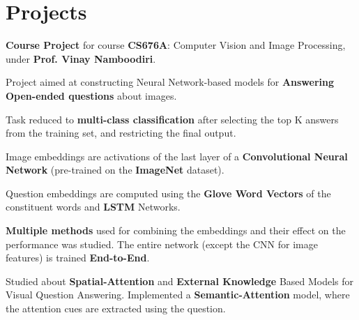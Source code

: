 \documentclass[a4paper]{norm-resume}
\begin{document}
\vspace{0mm}	%


\section{Projects \hrulefill}

\vspace{2mm} %

	\begin{tightitemize}
	\small
	{
	\item \textbf{Course Project} for course \textbf{CS676A}: Computer Vision and Image Processing, under \textbf{Prof. Vinay Namboodiri}.
	\item Project aimed at constructing Neural Network-based models for \textbf{Answering Open-ended questions} about images.
	\item Task reduced to \textbf{multi-class classification} after selecting the top K answers from the training set, and restricting the final output.
	\item Image embeddings are activations of the last layer of a \textbf{Convolutional Neural Network} (pre-trained on the \textbf{ImageNet} dataset).
	\item Question embeddings are computed using the \textbf{Glove Word Vectors} of the constituent words and \textbf{LSTM} Networks.
	\item \textbf{Multiple methods} used for combining the embeddings and their effect on the performance was studied. The entire network (except the CNN for image features) is trained \textbf{End-to-End}.
	\item Studied about \textbf{Spatial-Attention} and \textbf{External Knowledge} Based Models for Visual Question Answering. Implemented a \textbf{Semantic-Attention} model, where the attention cues are extracted using the question.
	}
	\end{tightitemize}

	\vspace{2mm}
\end{document}

